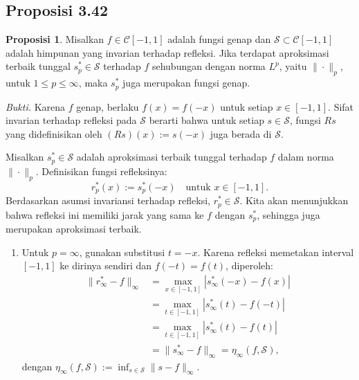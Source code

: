 \documentclass[aspectratio=169,11pt]{beamer}
\theoremstyle{definition}
\newtheorem{proposisi}{Proposisi}
\begin{document}
\subsection{Proposisi 3.42}

\begin{frame}[allowframebreaks=1]{\insertsection}{\insertsubsection}
  \setcounter{proposisi}{41}
  \begin{proposisi}
    Misalkan $f\in\mathcal{C}[-1,1]$ adalah fungsi genap dan $\mathcal{S}\subset\mathcal{C}[-1,1]$ adalah himpunan yang invarian terhadap refleksi. Jika terdapat aproksimasi terbaik tunggal $s_p^*\in\mathcal{S}$ terhadap $f$ sehubungan dengan norma $L^p$, yaitu $\|\cdot\|_p$, untuk $1\leq p\leq\infty$, maka $s_p^*$ juga merupakan fungsi genap.\label{prop:3.42}
  \end{proposisi}

  \textit{Bukti.}
  Karena $f$ genap, berlaku $f(x)=f(-x)$ untuk setiap $x\in[-1,1]$. Sifat invarian terhadap refleksi pada $\mathcal{S}$ berarti bahwa untuk setiap $s\in\mathcal{S}$, fungsi $Rs$ yang didefinisikan oleh $(Rs)(x):=s(-x)$ juga berada di $\mathcal{S}$.

  Misalkan $s_p^*\in\mathcal{S}$ adalah aproksimasi terbaik tunggal terhadap $f$ dalam norma $\|\cdot\|_p$. Definisikan fungsi refleksinya:
  \begin{equation*}
    r_p^*(x):=s_p^*(-x) \quad \text{untuk } x\in[-1,1].
  \end{equation*}
  Berdasarkan asumsi invariansi terhadap refleksi, $r_p^*\in\mathcal{S}$. Kita akan menunjukkan bahwa refleksi ini memiliki jarak yang sama ke $f$ dengan $s_p^*$, sehingga juga merupakan aproksimasi terbaik.

  \begin{enumerate}
    \item Untuk $p=\infty$, gunakan substitusi $t=-x$. Karena refleksi memetakan interval $[-1,1]$ ke dirinya sendiri dan $f(-t)=f(t)$, diperoleh:
          \begin{align*}
            \|r_\infty^*-f\|_\infty
             & =\max_{x\in[-1,1]}|s_\infty^*(-x)-f(x)|              \\
             & =\max_{t\in[-1,1]}|s_\infty^*(t)-f(-t)|              \\
             & =\max_{t\in[-1,1]}|s_\infty^*(t)-f(t)|               \\
             & =\|s_\infty^*-f\|_\infty=\eta_\infty(f,\mathcal{S}),
          \end{align*}
          dengan $\eta_\infty(f,\mathcal{S}):=\inf_{s\in\mathcal{S}}\|s-f\|_\infty$.


\end{enumerate}
\end{frame}
\end{document}
